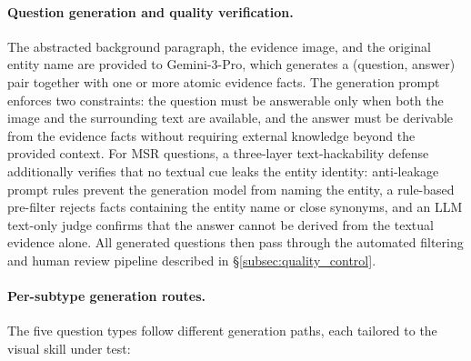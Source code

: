 \documentclass{article}
\begin{document}
\paragraph{Question generation and quality verification.}
The abstracted background paragraph, the evidence image, and the original entity name are provided to Gemini-3-Pro, which generates a (question, answer) pair together with one or more atomic evidence facts. The generation prompt enforces two constraints: the question must be answerable only when both the image and the surrounding text are available, and the answer must be derivable from the evidence facts without requiring external knowledge beyond the provided context. For MSR questions, a three-layer text-hackability defense additionally verifies that no textual cue leaks the entity identity: anti-leakage prompt rules prevent the generation model from naming the entity, a rule-based pre-filter rejects facts containing the entity name or close synonyms, and an LLM text-only judge confirms that the answer cannot be derived from the textual evidence alone. All generated questions then pass through the automated filtering and human review pipeline described in \S\ref{subsec:quality_control}.

\paragraph{Per-subtype generation routes.}
The five question types follow different generation paths, each tailored to the visual skill under test:
\end{document}
